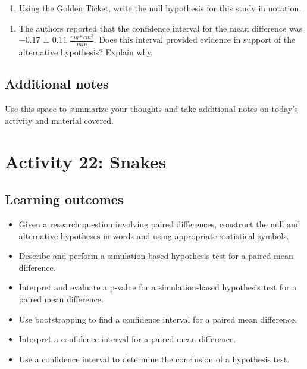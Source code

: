 \documentclass[
]{report}
\providecommand{\tightlist}{%
  \setlength{\itemsep}{0pt}\setlength{\parskip}{0pt}}
\begin{document}
\vspace{0.4in}

\begin{enumerate}
\def\labelenumi{\arabic{enumi}.}
\setcounter{enumi}{16}
\tightlist
\item
  Using the Golden Ticket, write the null hypothesis for this study in notation.
\end{enumerate}

\vspace{0.3in}

\begin{enumerate}
\def\labelenumi{\arabic{enumi}.}
\setcounter{enumi}{17}
\tightlist
\item
  The authors reported that the confidence interval for the mean difference was −0.17 ± 0.11 \(\frac{mg*cm^2}{min}\). Does this interval provided evidence in support of the alternative hypothesis? Explain why.
\end{enumerate}

\vspace{0.8in}

\subsection{Additional notes}\label{additional-notes-19}

Use this space to summarize your thoughts and take additional notes on today's activity and material covered.

\newpage

\section{Activity 22: Snakes}\label{activity-22-snakes}


\subsection{Learning outcomes}\label{learning-outcomes-24}

\begin{itemize}
\item
  Given a research question involving paired differences, construct the null and alternative hypotheses
  in words and using appropriate statistical symbols.
\item
  Describe and perform a simulation-based hypothesis test for a paired mean difference.
\item
  Interpret and evaluate a p-value for a simulation-based hypothesis test for a paired mean difference.
\item
  Use bootstrapping to find a confidence interval for a paired mean difference.
\item
  Interpret a confidence interval for a paired mean difference.
\item
  Use a confidence interval to determine the conclusion of a hypothesis test.
\end{itemize}
\end{document}
